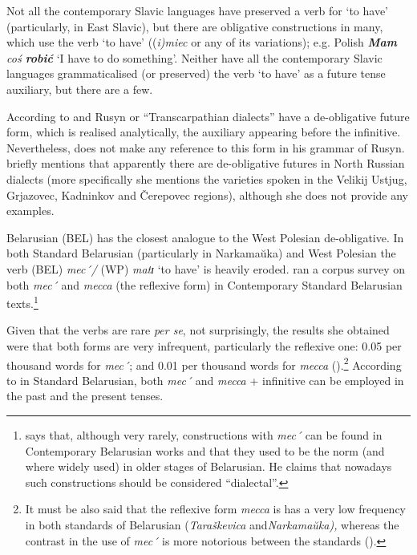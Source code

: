 \documentclass[output=paper,colorlinks,citecolor=brown]{langscibook}
\begin{document}
Not all the contemporary Slavic languages have preserved a verb for ‘to have’ (particularly, in East Slavic), but there are obligative constructions in many, which use the verb ‘to have’ ((\textit{i)miec} or any of its variations); e.g. Polish \textbf{\textit{Mam}}\textit{ coś \textbf{robić} }‘I have to do something’. Neither have all the contemporary Slavic languages grammaticalised (or preserved) the verb ‘to have’ as a future tense auxiliary, but there are a few.

According to \citet[172]{Danylenko2011} and \citet[58]{Whaley2000} Rusyn or “Transcarpathian dialects” have a de-obligative future form, which is realised analytically, the auxiliary appearing before the infinitive. Nevertheless, \citet{Pugh2009} does not make any reference to this form in his grammar of Rusyn. \citet[61]{Whaley2000} briefly mentions that apparently there are de-obligative futures in North Russian dialects (more specifically she mentions the varieties spoken in the Velikij Ustjug, Grjazovec, Kadninkov and Čerepovec regions), although she does not provide any examples.

Belarusian (BEL) has the closest analogue to the West Polesian de-obligative. In both Standard Belarusian (particularly in Narkamaŭka) and West Polesian the verb (BEL) \textit{mec´/} (WP) \textit{matɪ} ‘to have’ is heavily eroded. \citet{Mazzitelli2011} ran a corpus survey on both \textit{mec´} and \textit{mecca} (the reflexive form) in Contemporary Standard Belarusian texts.\footnote{\citet[181]{Lomtev1956} says that, although very rarely, constructions with \textit{mec´} can be found in Contemporary Belarusian works and that they used to be the norm (and where widely used) in older stages of Belarusian. He claims that nowadays such constructions should be considered “dialectal”.}

Given that the verbs are rare \textit{per se}, not surprisingly, the results she obtained were that both forms are very infrequent, particularly the reflexive one: 0.05 per thousand words for \textit{mec´}; and 0.01 per thousand words for \textit{mecca} (\citeyear[180--181]{Mazzitelli2011}).\footnote{It must be also said that the reflexive form \textit{mecca} is has a very low frequency in both standards of Belarusian (\textit{Taraškevica }and\textit{Narkamaŭka), }whereas the contrast in the use of \textit{mec´} is more notorious between the standards (\cite[181]{Mazzitelli2011}).} According to \citet[200]{Mackevic1959} in Standard Belarusian, both \textit{mec´} and \textit{mecca }+ infinitive can be employed in the past and the present tenses.
\end{document}
